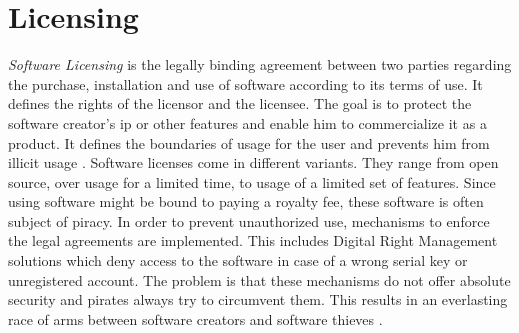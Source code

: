 \section{Licensing} \label{subsection:introduction-licensing}
\textit{Software Licensing} is the legally binding agreement between two parties regarding the purchase, installation and use of software according to its terms of use.
It defines the rights of the licensor and the licensee.
The goal is to protect the software creator's \gls{ip} or other features and enable him to commercialize it as a product.
It defines the boundaries of usage for the user and prevents him from illicit usage \cite{uncgLicensing}.
\newline
Software licenses come in different variants.
They range from open source, over usage for a limited time, to usage of a limited set of features.
Since using software might be bound to paying a royalty fee, these software is often subject of piracy.
In order to prevent unauthorized use, mechanisms to enforce the legal agreements are implemented.
This includes Digital Right Management solutions which deny access to the software in case of a wrong serial key or unregistered account.
\newline
\newline
The problem is that these mechanisms do not offer absolute security and pirates always try to circumvent them.
This results in an everlasting race of arms between software creators and software thieves \cite{szCopy}.

